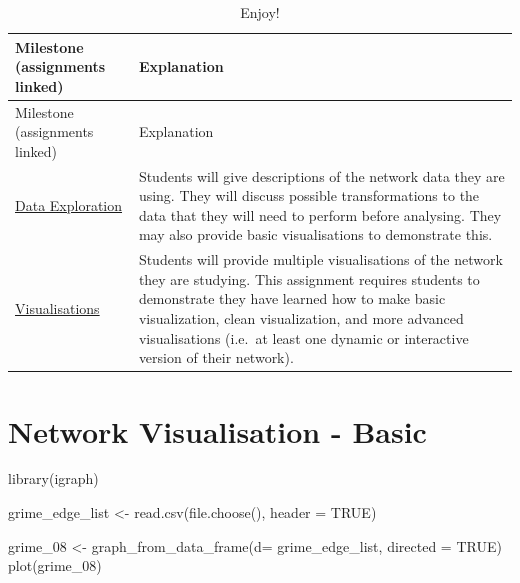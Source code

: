 \documentclass[
  letterpaper,
  DIV=11,
  numbers=noendperiod]{scrreprt}
\newenvironment{Shaded}{\begin{snugshade}}{\end{snugshade}}
\newcommand{\AttributeTok}[1]{\textcolor[rgb]{0.40,0.45,0.13}{#1}}
\newcommand{\ConstantTok}[1]{\textcolor[rgb]{0.56,0.35,0.01}{#1}}
\newcommand{\FunctionTok}[1]{\textcolor[rgb]{0.28,0.35,0.67}{#1}}
\newcommand{\NormalTok}[1]{\textcolor[rgb]{0.00,0.23,0.31}{#1}}
\newcommand{\OtherTok}[1]{\textcolor[rgb]{0.00,0.23,0.31}{#1}}
\begin{document}
\begin{longtable}[]{@{}
  >{\raggedright\arraybackslash}p{}
  >{\raggedright\arraybackslash}p{}@{}}
\caption{Enjoy!}\tabularnewline
\toprule\noalign{}
\begin{minipage}[b]{\linewidth}\raggedright
Milestone (assignments linked)
\end{minipage} & \begin{minipage}[b]{\linewidth}\raggedright
Explanation
\end{minipage} \\
\midrule\noalign{}
\endfirsthead
\toprule\noalign{}
\begin{minipage}[b]{\linewidth}\raggedright
Milestone (assignments linked)
\end{minipage} & \begin{minipage}[b]{\linewidth}\raggedright
Explanation
\end{minipage} \\
\midrule\noalign{}
\endhead
\bottomrule\noalign{}
\endlastfoot
\href{A3_Data\%20Exploration.qmd}{Data Exploration} & Students will give
descriptions of the network data they are using. They will discuss
possible transformations to the data that they will need to perform
before analysing. They may also provide basic visualisations to
demonstrate this. \\
\href{A4_Visualisations.qmd}{Visualisations} & Students will provide
multiple visualisations of the network they are studying. This
assignment requires students to demonstrate they have learned how to
make basic visualization, clean visualization, and more advanced
visualisations (i.e.~at least one dynamic or interactive version of
their network). \\
\end{longtable}

\chapter{Network Visualisation -
Basic}\label{network-visualisation---basic}

\begin{Shaded}
\begin{Highlighting}[]
\FunctionTok{library}\NormalTok{(igraph)}

\NormalTok{grime\_edge\_list }\OtherTok{\textless{}{-}} \FunctionTok{read.csv}\NormalTok{(}\FunctionTok{file.choose}\NormalTok{(), }\AttributeTok{header =} \ConstantTok{TRUE}\NormalTok{)}

\NormalTok{grime\_08 }\OtherTok{\textless{}{-}} \FunctionTok{graph\_from\_data\_frame}\NormalTok{(}\AttributeTok{d=}\NormalTok{ grime\_edge\_list, }\AttributeTok{directed =} \ConstantTok{TRUE}\NormalTok{)}
\FunctionTok{plot}\NormalTok{(grime\_08)}
\end{Highlighting}
\end{Shaded}
\end{document}
